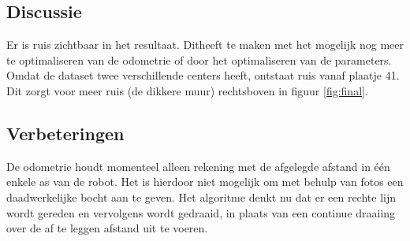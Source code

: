 \documentclass[a4paper]{article}
\begin{document}
\subsection{Discussie}
Er is ruis zichtbaar in het resultaat. Ditheeft te maken met het mogelijk nog meer te optimaliseren van de odometrie of door het optimaliseren van de parameters.
Omdat de dataset twee verschillende centers heeft, ontstaat ruis vanaf plaatje 41. Dit zorgt voor meer ruis (de dikkere muur) rechtsboven in figuur \ref{fig:final}.
\subsection{Verbeteringen}
De odometrie houdt momenteel alleen rekening met de afgelegde afstand in één enkele as van de robot. Het is hierdoor niet mogelijk om met behulp van fotos een daadwerkelijke bocht aan te geven. Het algoritme denkt nu dat er een rechte lijn wordt gereden en vervolgens wordt gedraaid, in plaats van een continue draaiing over de af te leggen afstand uit te voeren.
\end{document}
